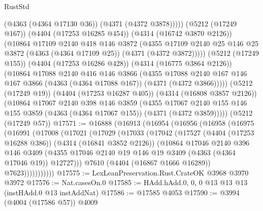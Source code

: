 \begin{lexlean}{RustStd}
\begin{coremodule}
{\begin{coremodule}
{{{{{{{{{{{{{{{{                (@4363 (@4364 @17130 @36))
                (@4371 (@4372 @3878)))))
          (@5212 (@17249 @167))
          (@4404 (@17253 @16285 @454))
          (@4314 (@16742 @3870 @2126))
          (@10864
            @17109
            @2140
            @418
            @146
            @3872
            (@4355
              @17109
              @2140
              @25
              @146
              @25
              @3872
              (@4363 (@4364 @17109 @25))
              (@4371 (@4372 @3872)))))
        (@5212 (@17249 @155))
        (@4404 (@17253 @16286 @428))
        (@4314 (@16775 @3864 @2126))
        (@10864
          @17088
          @2140
          @416
          @146
          @3866
          (@4355
            @17088
            @2140
            @167
            @146
            @167
            @3866
            (@4363 (@4364 @17088 @167))
            (@4371 (@4372 @3866)))))
      (@5212 (@17249 @19))
      (@4404 (@17253 @16287 @405))
      (@4314 (@16808 @3857 @2126))
      (@10864
        @17067
        @2140
        @398
        @146
        @3859
        (@4355
          @17067
          @2140
          @155
          @146
          @155
          @3859
          (@4363 (@4364 @17067 @155))
          (@4371 (@4372 @3859)))))
    (@5212 (@17249 @57))
@17571 := @16888
    (@16913
      (@16954
        (@16956
          (@16958
            (@16975
              (@16991
                (@17008
                  (@17021
                    (@17029
                      (@17033
                        (@17042
                          (@17527
                            (@4404 (@17253 @16288 @386))
                            (@4314 (@16841 @3852 @2126))
                            (@10864
                              @17046
                              @2140
                              @396
                              @146
                              @3409
                              (@4355
                                @17046
                                @2140
                                @19
                                @146
                                @19
                                @3409
                                (@4363 (@4364 @17046 @19))
                                @12727)))
                          @7610
                          (@4404 (@16867 @1666 @16289))
                          @7623)))))))))))
@17575 := LexLeanPreservation.Rust.CrateOK @3968 @3970 @3972
@17576 := Nat.casesOn.{0}
@17585 := HAdd.hAdd.{0, 0, 0} @13 @13 @13 (instHAdd.{0} @13 instAddNat)
@17586 := @17585 @4053
@17590 := @3994 (@4004 (@17586 @57)) @4009
}}}}}}}}}}}}}}}}
\end{coremodule}}
\end{coremodule}
\end{lexlean}
